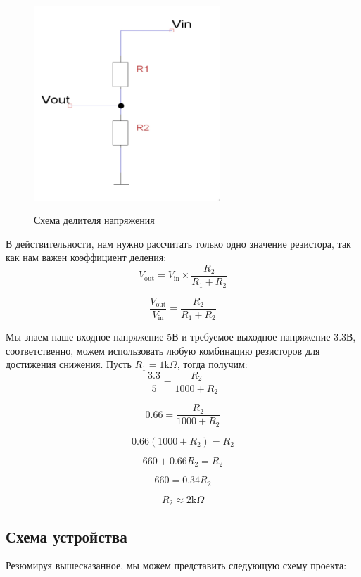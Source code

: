 \documentclass[a4paper, 14pt]{article}
\begin{document}
\begin{figure}[H]
	\centering
	\includegraphics[width=7cm]{screenshots/2.png}\\
	\caption{Схема делителя напряжения}
\end{figure}

В действительности, нам нужно рассчитать только одно значение резистора, так как нам важен коэффициент деления:
$$V_\text{out} = V_\text{in} \times \frac{R_2}{R_1 + R_2}$$

$$\frac{V_\text{out}}{V_\text{in}} = \frac{R_2}{R_1+R_2}$$

Мы знаем наше входное напряжение 5В и требуемое выходное напряжение 3.3В, соответственно, можем использовать любую комбинацию резисторов для достижения снижения. Пусть $R_1 = 1\text{k}\Omega$, тогда получим:
$$\frac{3.3}{5}=\frac{R_2}{1000+R_2}$$

$$0.66=\frac{R_2}{1000+R_2}$$

$$0.66(1000+R_2) = R_2$$

$$660 + 0.66R_2 = R_2$$

$$660 = 0.34R_2$$

$$R_2 \approx 2\text{k}\Omega$$

\subsection{Схема устройства}

Резюмируя вышесказанное, мы можем представить следующую схему проекта:
\end{document}
